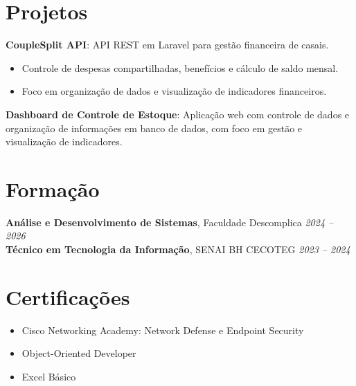 \documentclass[11pt,a4paper]{article}
\begin{document}
\section{Projetos}

\textbf{CoupleSplit API}: API REST em Laravel para gestão financeira de casais.
\begin{itemize}
  \item Controle de despesas compartilhadas, benefícios e cálculo de saldo mensal.
  \item Foco em organização de dados e visualização de indicadores financeiros.
\end{itemize}

\medskip

\textbf{Dashboard de Controle de Estoque}: Aplicação web com controle de dados e organização
de informações em banco de dados, com foco em gestão e visualização de indicadores.

\section{Formação}

\textbf{Análise e Desenvolvimento de Sistemas}, Faculdade Descomplica \hfill \textit{2024 -- 2026}\\
\textbf{Técnico em Tecnologia da Informação}, SENAI BH CECOTEG \hfill \textit{2023 -- 2024}

\section{Certificações}
\begin{itemize}
  \item Cisco Networking Academy: Network Defense e Endpoint Security
  \item Object-Oriented Developer
  \item Excel Básico
\end{itemize}
\end{document}

